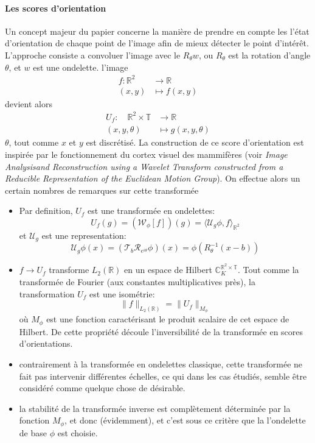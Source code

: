 \documentclass{article}
\begin{document}
\paragraph{Les scores d'orientation} 
Un concept majeur du papier concerne la manière de prendre en compte les l'état
d'orientation de chaque point de l'image afin de mieux détecter le point d'intérêt.
L'approche consiste a convoluer l'image avec le $ R_{\theta} w $, ou $ R_{\theta} $ est la rotation d'angle $ \theta  $, et $ w $ est une ondelette.
l'image 
\[
    \begin{aligned}
        f: \mathbb{R}^2 &\longrightarrow \mathbb{R} \\
        (x, y) &\longmapsto f(x, y)
    \end{aligned}
\] 
devient alors 
\[
\begin{aligned}
    U_f: \quad \mathbb{R}^2\times \mathbb{ T } &\longrightarrow \mathbb{R} \\
    (x, y, \theta) &\longmapsto g(x, y, \theta)
\end{aligned}
\] 
$ \theta $, tout comme $ x $ et $ y $ est discrétisé.
La construction de ce score d'orientation est inspirée par le fonctionnement du cortex
visuel des mammifères (voir \emph{Image Analysisand Reconstruction using a Wavelet
Transform constructed from a Reducible Representation of the Euclidean Motion Group}).
On effectue alors un certain nombres de remarques sur cette transformée
\begin{itemize}
    \item Par definition, $  U_f $ est une transformée en ondelettes:
        \[
             U_f(g) =  (\mathcal W_{\phi}[f])(g)  = \langle \mathcal  U_g \phi, f
             \rangle_{\mathbb{R}^2}
        \] 
        et $ \mathcal  U_g $ est une representation:
        \[
            \mathcal  U_g \phi(x) = (\mathcal  T_b \mathcal  R_{e^{i \theta}} \phi )(x)
            = \phi \left ( R_{\theta}^{-1}(x - b) \right )
        \] 
        \item $ f  \to U_f $ transforme $ L_2(\mathbb{R}) $ en un espace de Hilbert $
        \mathbb C_K^{\mathbb{R}^2 \times \mathbb{ T }} $.\newline
        Tout comme la transformée de Fourier (aux constantes multiplicatives près), la
        transformation $ U_f $ est une isométrie:
        \[
            \|f\|_{L_2(\mathbb{R})} = \|U_f\|_{M_{\phi}}
        \] 
        où $ M_{\phi} $ est une fonction caractérisant le produit scalaire de cet espace
        de Hilbert.\newline
        De cette propriété découle l'inversibilité de la transformée en scores
        d'orientations.
        \item contrairement à la transformée en ondelettes classique, cette transformée
            ne fait pas intervenir différentes échelles, ce qui dans les cas étudiés,
            semble être considéré comme quelque chose de désirable.
        \item la stabilité de la transformée inverse est complètement déterminée par la
            fonction $ M_{\phi} $, et donc (évidemment), et c'est sous ce critère que la
            l'ondelette de base $ \phi $ est choisie.
\end{itemize}
\end{document}
